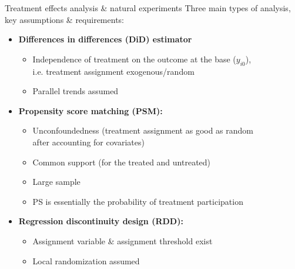 \documentclass{beamer}
\begin{document}
\begin{frame}{Treatment effects analysis \& natural experiments}
Three main types of analysis, key assumptions \& requirements:\\
\bigskip
\begin{itemize}
    \item \textbf{Differences in differences (DiD) estimator}\\
        \begin{itemize}
            \item Independence of treatment on the outcome at the base ($y_{i0}$), \\i.e. treatment assignment exogenous/random
            \item Parallel trends assumed
        \end{itemize}
    \bigskip
    \item \textbf{Propensity score matching (PSM):}
        \begin{itemize}
            \item Unconfoundedness (treatment assignment as good as random \\after accounting for covariates)
            \item Common support (for the treated and untreated)
            \item Large sample 
            \item PS is essentially the probability of treatment participation
        \end{itemize}
    \bigskip
    \item \textbf{Regression discontinuity design (RDD):}
        \begin{itemize}
            \item Assignment variable \& assignment threshold exist
            \item Local randomization assumed
        \end{itemize}
\end{itemize}
\end{frame}
\end{document}
